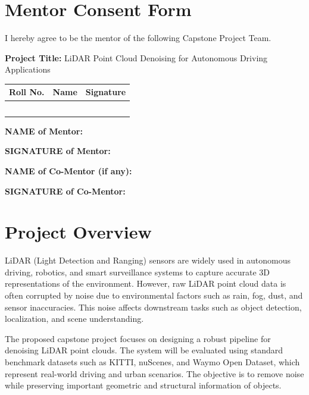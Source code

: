 \documentclass[12pt,a4paper]{article}
\begin{document}
\setcounter{page}{1}

\section*{Mentor Consent Form}

I hereby agree to be the mentor of the following Capstone Project Team.

\textbf{Project Title:} LiDAR Point Cloud Denoising for Autonomous Driving Applications

\vspace{0.5cm}
\begin{center}
\renewcommand{\arraystretch}{2.2}
\begin{tabular}{|p{2cm}|p{6cm}|p{4.5cm}|}
\hline
\textbf{Roll No.} & \textbf{Name} & \textbf{Signature}\\\hline
 & & \\\hline
 & & \\\hline
 & & \\\hline
 & & \\\hline
 & & \\\hline
\end{tabular}
\end{center}

\vspace{1cm}
\textbf{NAME of Mentor:} \dotfill

\textbf{SIGNATURE of Mentor:} \dotfill

\textbf{NAME of Co-Mentor (if any):} \dotfill

\textbf{SIGNATURE of Co-Mentor:} \dotfill
\clearpage

\section{Project Overview}

LiDAR (Light Detection and Ranging) sensors are widely used in autonomous
driving, robotics, and smart surveillance systems to capture accurate 3D
representations of the environment. However, raw LiDAR point cloud data is
often corrupted by noise due to environmental factors such as rain, fog,
dust, and sensor inaccuracies. This noise affects downstream tasks such as
object detection, localization, and scene understanding.

The proposed capstone project focuses on designing a robust pipeline for
denoising LiDAR point clouds. The system will be evaluated using standard
benchmark datasets such as KITTI, nuScenes, and Waymo Open Dataset, which
represent real-world driving and urban scenarios. The objective is to remove
noise while preserving important geometric and structural information of
objects.
\end{document}
